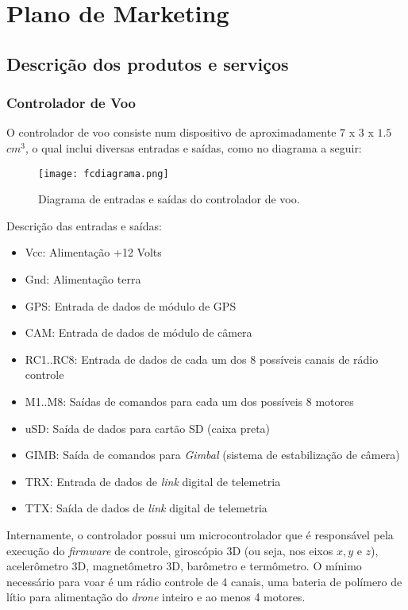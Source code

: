 \section{Plano de Marketing}

\subsection{Descrição dos produtos e serviços}

\subsubsection*{Controlador de Voo}

O controlador de voo consiste num dispositivo de aproximadamente 
$7$ x $3$ x $1.5$ $cm^3$, o qual inclui diversas entradas e saídas, 
como no diagrama a seguir:

\begin{figure}[H]
\centering
\texttt{[image: fcdiagrama.png]}
\caption{Diagrama de entradas e saídas do controlador de voo.}
\label{fig:fcdiagrama}
\end{figure}

Descrição das entradas e saídas:
\begin{itemize}
	\item Vcc: Alimentação +12 Volts
	\item Gnd: Alimentação terra
	\item GPS: Entrada de dados de módulo de GPS
	\item CAM: Entrada de dados de módulo de câmera
	\item RC1..RC8: Entrada de dados de cada um dos 8 possíveis 
	canais de rádio controle
	\item M1..M8: Saídas de comandos para cada um dos possíveis 8 motores
	\item uSD: Saída de dados para cartão SD (caixa preta)
	\item GIMB: Saída de comandos para \emph{Gimbal} (sistema de estabilização de câmera)
	\item TRX: Entrada de dados de \emph{link} digital de telemetria
	\item TTX: Saída de dados de \emph{link} digital de telemetria
\end{itemize}

Internamente, o controlador possui um microcontrolador que é 
responsável pela execução do \emph{firmware} de controle, giroscópio 
3D (ou seja, nos eixos $x, y$ e $z$), acelerômetro 3D, magnetômetro 
3D, barômetro e termômetro. O mínimo necessário para voar é um rádio
controle de 4 canais, uma bateria de polímero de lítio para 
alimentação do \emph{drone} inteiro e ao menos 4 motores.

